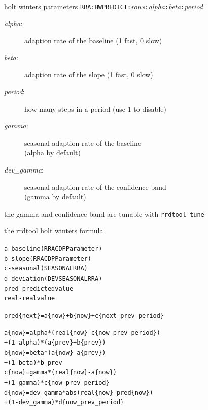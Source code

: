 \begin{frame}{holt winters parameters}
\texttt{RRA:HWPREDICT:}\emph{rows}\texttt{:}\emph{alpha}\texttt{:}\emph{beta}\texttt{:}\emph{period}

\begin{description}
\item[\emph{alpha}:] adaption rate of the baseline (1 fast, 0 slow)
\item[\emph{beta}:] adaption rate of the slope (1 fast, 0 slow)
\item[\emph{period}:] how many steps in a period (use 1 to  disable)
\item[\emph{gamma}:] seasonal adaption rate of the baseline\\(alpha by
  default)
\item[\emph{dev\_gamma}:] seasonal adaption rate of the confidence
  band\\
 (gamma by default)
\end{description}

the gamma and confidence band are tunable with \texttt{rrdtool tune}
\end{frame}


\begin{frame}[fragile]{the rrdtool holt winters formula}
\begin{small}
\begin{alltt}
a - baseline (RRA CDP Parameter)
b - slope (RRA CDP Parameter)
c - seasonal (SEASONAL RRA)
d - deviation (DEVSEASONAL RRA)
pred - predicted value
real - real value\pause

pred\{next\} = a\{now\} + b\{now\} + c\{next_prev_period\}\pause

a\{now\} = alpha * (real\{now\} - c\{now_prev_period\}) 
         + (1-alpha) * ( a\{prev\} + b\{prev\})\pause
b\{now\} = beta  * (a\{now\} - a\{prev\}) 
         + (1-beta) * b_prev\pause
c\{now\} = gamma * (real\{now\} - a\{now\}) 
         + (1-gamma) * c\{now_prev_period\}\pause
d\{now\} = dev_gamma * abs(real\{now\} - pred\{now\}) 
         + (1-dev_gamma) * d\{now_prev_period\}\pause

\end{alltt}
\end{small}
\end{frame}

